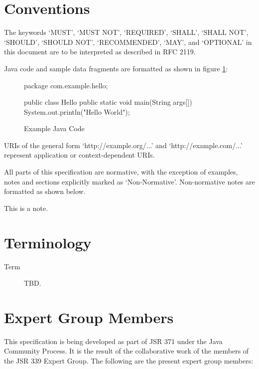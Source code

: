 \section{Conventions}

The keywords `MUST', `MUST NOT', `REQUIRED', `SHALL', `SHALL NOT', `SHOULD', `SHOULD NOT', `RECOMMENDED', `MAY',
and `OPTIONAL' in this document are to be interpreted as described in RFC 2119\cite{rfc2119}. 

Java code and sample data fragments are formatted as shown in figure \ref{ex1}:

\begin{figure}[hbtp]
\caption{Example Java Code}
\label{ex1}
\begin{listing}{1}
package com.example.hello;

public class Hello {
    public static void main(String args[]) {
        System.out.println("Hello World");
    }
}\end{listing}
\end{figure}

URIs of the general form `http://example.org/...' and `http://example.com/...' represent application or
 context-dependent URIs.

All parts of this specification are normative, with the exception of examples, notes and sections explicitly
 marked as `Non-Normative'. Non-normative notes are formatted as shown below.

\begin{nnnote*}
This is a note.
\end{nnnote*}

\section{Terminology}
\label{terminology}

\begin{description}
\item[Term] TBD.
\end{description}

\section{Expert Group Members} 
\label{expert_group}

This specification is being developed as part of JSR 371 under the Java Community Process. It is the result
of the collaborative work of the members of the JSR 339 Expert Group. The following are the present expert
group members:

